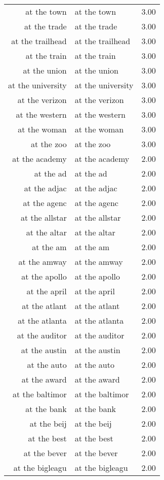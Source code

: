 \begin{table}[ht]
\begin{tabular}{rlr}
  at the town & at the town & 3.00 \\ 
  at the trade & at the trade & 3.00 \\ 
  at the trailhead & at the trailhead & 3.00 \\ 
  at the train & at the train & 3.00 \\ 
  at the union & at the union & 3.00 \\ 
  at the university & at the university & 3.00 \\ 
  at the verizon & at the verizon & 3.00 \\ 
  at the western & at the western & 3.00 \\ 
  at the woman & at the woman & 3.00 \\ 
  at the zoo & at the zoo & 3.00 \\ 
  at the academy & at the academy & 2.00 \\ 
  at the ad & at the ad & 2.00 \\ 
  at the adjac & at the adjac & 2.00 \\ 
  at the agenc & at the agenc & 2.00 \\ 
  at the allstar & at the allstar & 2.00 \\ 
  at the altar & at the altar & 2.00 \\ 
  at the am & at the am & 2.00 \\ 
  at the amway & at the amway & 2.00 \\ 
  at the apollo & at the apollo & 2.00 \\ 
  at the april & at the april & 2.00 \\ 
  at the atlant & at the atlant & 2.00 \\ 
  at the atlanta & at the atlanta & 2.00 \\ 
  at the auditor & at the auditor & 2.00 \\ 
  at the austin & at the austin & 2.00 \\ 
  at the auto & at the auto & 2.00 \\ 
  at the award & at the award & 2.00 \\ 
  at the baltimor & at the baltimor & 2.00 \\ 
  at the bank & at the bank & 2.00 \\ 
  at the beij & at the beij & 2.00 \\ 
  at the best & at the best & 2.00 \\ 
  at the bever & at the bever & 2.00 \\ 
  at the bigleagu & at the bigleagu & 2.00 \\ 

\end{tabular}
\end{table}
